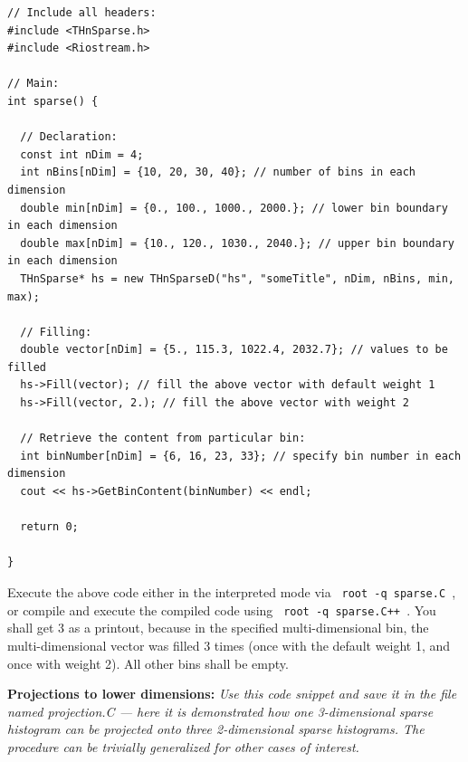 \documentclass[11pt]{article}
\begin{document}
\begin{verbatim}
// Include all headers:
#include <THnSparse.h>
#include <Riostream.h>

// Main:
int sparse() {

  // Declaration:
  const int nDim = 4;
  int nBins[nDim] = {10, 20, 30, 40}; // number of bins in each dimension
  double min[nDim] = {0., 100., 1000., 2000.}; // lower bin boundary in each dimension
  double max[nDim] = {10., 120., 1030., 2040.}; // upper bin boundary in each dimension
  THnSparse* hs = new THnSparseD("hs", "someTitle", nDim, nBins, min, max);

  // Filling:
  double vector[nDim] = {5., 115.3, 1022.4, 2032.7}; // values to be filled
  hs->Fill(vector); // fill the above vector with default weight 1  
  hs->Fill(vector, 2.); // fill the above vector with weight 2

  // Retrieve the content from particular bin:
  int binNumber[nDim] = {6, 16, 23, 33}; // specify bin number in each dimension
  cout << hs->GetBinContent(binNumber) << endl; 

  return 0;

}
\end{verbatim}

\noindent Execute the above code either in the interpreted mode via \verb| root -q sparse.C |, or compile and execute the compiled code using \verb| root -q sparse.C++ |. You shall get 3 as a printout, because in the specified multi-dimensional bin, the multi-dimensional vector was filled 3 times (once with the default weight 1, and once with weight 2). All other bins shall be empty.  

\bigskip

\noindent\textbf{Projections to lower dimensions:} {\it Use this code snippet and save it in the file named {\it projection.C} --- here it is demonstrated how one 3-dimensional sparse histogram can be projected onto three 2-dimensional sparse histograms. The procedure can be trivially generalized for other cases of interest.}
\end{document}
